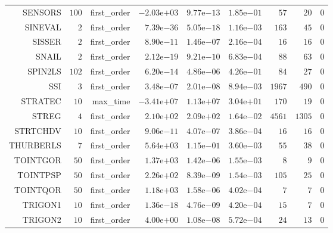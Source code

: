 \begin{longtable}{rrrrrrrrr}
SENSORS & \(   100\) & first\_order & \(-2.03\)e\(+03\) & \( 9.77\)e\(-13\) & \( 1.85\)e\(-01\) & \(    57\) & \(    20\) & \(     0\) \\
SINEVAL & \(     2\) & first\_order & \( 7.39\)e\(-36\) & \( 5.05\)e\(-18\) & \( 1.16\)e\(-03\) & \(   163\) & \(    45\) & \(     0\) \\
SISSER & \(     2\) & first\_order & \( 8.90\)e\(-11\) & \( 1.46\)e\(-07\) & \( 2.16\)e\(-04\) & \(    16\) & \(    16\) & \(     0\) \\
SNAIL & \(     2\) & first\_order & \( 2.12\)e\(-19\) & \( 9.21\)e\(-10\) & \( 6.83\)e\(-04\) & \(    88\) & \(    63\) & \(     0\) \\
SPIN2LS & \(   102\) & first\_order & \( 6.20\)e\(-14\) & \( 4.86\)e\(-06\) & \( 4.26\)e\(-01\) & \(    84\) & \(    27\) & \(     0\) \\
SSI & \(     3\) & first\_order & \( 3.48\)e\(-07\) & \( 2.01\)e\(-08\) & \( 8.94\)e\(-03\) & \(  1967\) & \(   490\) & \(     0\) \\
STRATEC & \(    10\) & max\_time & \(-3.41\)e\(+07\) & \( 1.13\)e\(+07\) & \( 3.04\)e\(+01\) & \(   170\) & \(    19\) & \(     0\) \\
STREG & \(     4\) & first\_order & \( 2.10\)e\(+02\) & \( 2.09\)e\(+02\) & \( 1.64\)e\(-02\) & \(  4561\) & \(  1305\) & \(     0\) \\
STRTCHDV & \(    10\) & first\_order & \( 9.06\)e\(-11\) & \( 4.07\)e\(-07\) & \( 3.86\)e\(-04\) & \(    16\) & \(    16\) & \(     0\) \\
THURBERLS & \(     7\) & first\_order & \( 5.64\)e\(+03\) & \( 1.15\)e\(-01\) & \( 3.60\)e\(-03\) & \(    55\) & \(    38\) & \(     0\) \\
TOINTGOR & \(    50\) & first\_order & \( 1.37\)e\(+03\) & \( 1.42\)e\(-06\) & \( 1.55\)e\(-03\) & \(     8\) & \(     9\) & \(     0\) \\
TOINTPSP & \(    50\) & first\_order & \( 2.26\)e\(+02\) & \( 8.39\)e\(-09\) & \( 1.54\)e\(-03\) & \(   105\) & \(    25\) & \(     0\) \\
TOINTQOR & \(    50\) & first\_order & \( 1.18\)e\(+03\) & \( 1.58\)e\(-06\) & \( 4.02\)e\(-04\) & \(     7\) & \(     7\) & \(     0\) \\
TRIGON1 & \(    10\) & first\_order & \( 1.36\)e\(-18\) & \( 4.76\)e\(-09\) & \( 4.20\)e\(-04\) & \(    15\) & \(     7\) & \(     0\) \\
TRIGON2 & \(    10\) & first\_order & \( 4.00\)e\(+00\) & \( 1.08\)e\(-08\) & \( 5.72\)e\(-04\) & \(    24\) & \(    13\) & \(     0\) \\

\end{longtable}
